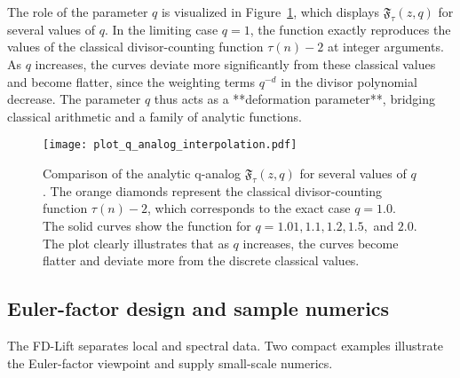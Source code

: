 \documentclass[11pt,a4paper]{amsart}
\theoremstyle{plain}
\theoremstyle{definition}
\theoremstyle{remark}
\begin{document}
The role of the parameter $q$ is visualized in Figure~\ref{fig:q_analog_interpolation}, which displays $\mathfrak{F}_\tau(z,q)$ for several values of $q$. In the limiting case $q=1$, the function exactly reproduces the values of the classical divisor-counting function $\tau(n)-2$ at integer arguments. As $q$ increases, the curves deviate more significantly from these classical values and become flatter, since the weighting terms $q^{-d}$ in the divisor polynomial decrease. The parameter $q$ thus acts as a **deformation parameter**, bridging classical arithmetic and a family of analytic functions.

\begin{figure}[!htbp]
\centering
\texttt{[image: plot\_q\_analog\_interpolation.pdf]}
\caption{Comparison of the analytic q-analog $\mathfrak{F}_\tau(z,q)$ for several values of $q$. The orange diamonds represent the classical divisor-counting function $\tau(n)-2$, which corresponds to the exact case $q=1.0$. The solid curves show the function for $q = 1.01, 1.1, 1.2, 1.5,$ and $2.0$. The plot clearly illustrates that as $q$ increases, the curves become flatter and deviate more from the discrete classical values.}
\label{fig:q_analog_interpolation}
\end{figure}

\FloatBarrier

\subsection{Euler-factor design and sample numerics}
The FD-Lift separates local and spectral data. Two compact examples illustrate the Euler-factor viewpoint and supply small-scale numerics.
\end{document}
